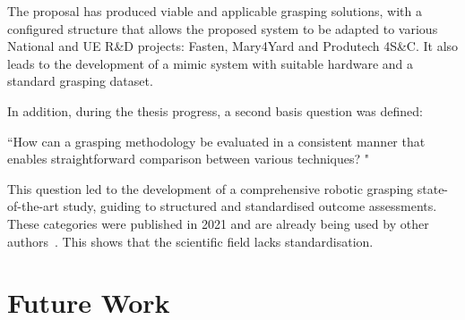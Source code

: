 The proposal has produced viable and applicable grasping solutions, with a configured structure that allows the proposed system to be adapted to various National and UE R\&D projects: Fasten, Mary4Yard and Produtech 4S\&C. It also leads to the development of a mimic system with suitable hardware and a standard grasping dataset.

In addition, during the thesis progress, a second basis question was defined:

\begin{flushright}
	``How can a grasping methodology be evaluated in a consistent manner that enables straightforward comparison between various techniques? "
\end{flushright} 

This question led to the development of a comprehensive robotic grasping state-of-the-art study, guiding to structured and standardised outcome assessments. These categories were published in 2021 and are already being used by other authors~\cite{hu2022grasps}. This shows that the scientific field lacks standardisation.



\section{Future Work}

